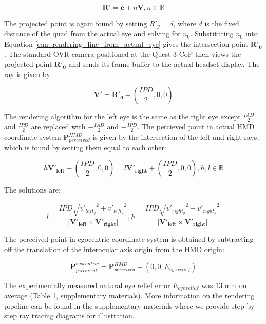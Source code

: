 \begin{equation}
	\label{eqn: rendering_line_from_actual_eye}
	\mathbf{R'} = \mathbf{e} + n \mathbf{V},   n \in \mathbb{R}
\end{equation}

The projected point is again found by setting $R'_{y}=d$, where $d$ is the fixed distance of the quad from the actual eye and solving for $n_{0}$. Substituting $n_{0}$ into Equation \ref{eqn: rendering_line_from_actual_eye} gives the intersection point $\mathbf{R'_{0}}$. The standard OVR camera positioned at the Quest 3 CoP then views the projected point $\mathbf{R'_{0}}$ and sends its frame buffer to the actual headset display. The ray is given by: 

\begin{equation}
	\mathbf{V'} = \mathbf{R'_{0}} - (\frac{IPD}{2}, 0, 0)
\end{equation}

The rendering algorithm for the left eye is the same as the right eye except $\frac{IAD}{2}$ and $\frac{IPD}{2}$ are replaced with $-\frac{IAD}{2}$ and $-\frac{IPD}{2}$. The percieved point in actual HMD coordinate system ${\textbf{P}}^{HMD}_{perceived}$ is given by the intersection of the left and right rays, which is found by setting them equal to each other:

\begin{equation}
	h \mathbf{V'_{left}} - (\frac{IPD}{2}, 0, 0) =l \mathbf{V'_{right}} + (\frac{IPD}{2}, 0, 0), h, l \in \mathbb{R}
\end{equation}

The solutions are: 

\begin{equation}
		l = \frac{IPD \sqrt{{v'_{left_{y}}}^2+{v'_{left_{z}}}^2}}{\vert \mathbf{V'_{left}} \times \mathbf{V'_{right}}\vert} , h = \frac{IPD \sqrt{{v'_{right_{y}}}^2+{v'_{right_{z}}}^2}}{\vert \mathbf{V'_{left}} \times \mathbf{V'_{right}}\vert} 
\end{equation}

The perceived point in egocentric coordinate system is obtained by subtracting off the translation of the interocular axis origin from the HMD origin: 

\begin{equation}
	{\textbf{P}}^{egocentric}_{perceived} = {\textbf{P}}^{HMD}_{perceived} - (0, 0, E_{eye\,relief})
\end{equation}

The experimentally measured natural eye relief error $E_{eye\,relief}$ was 13 mm on average (Table 1, supplementary materials). More information on the rendering pipeline can be found in the supplementary materials where we provide step-by-step ray tracing diagrams for illustration.

